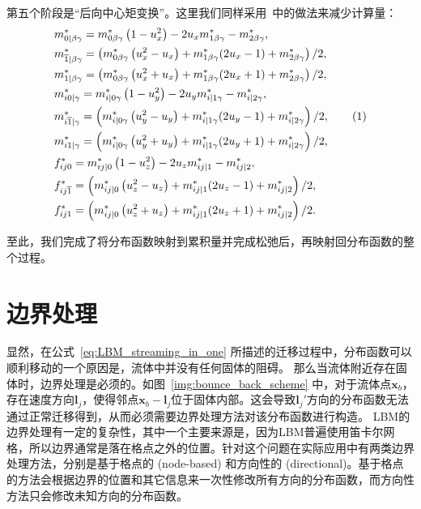 第五个阶段是“后向中心矩变换”。这里我们同样采用~\citep{Geier-2015}中的做法来减少计算量：
\begin{align*}
    & m_{0 \mid \beta \gamma}^{*}=m_{0 \beta \gamma}^{*}\left(1-u_x^{2}\right)-2u_x m_{1 \beta \gamma}^{*}-m_{2 \beta \gamma}^{*}, \\
    & m_{\overline{1} \mid \beta \gamma}^{*}=\left(m_{0 \beta \gamma}^{*}\left(u_x^{2}-u_x\right)+m_{1 \beta \gamma}^{*}(2 u_x-1)+m_{2 \beta \gamma}^{*}\right) / 2, \\
    & m_{1 \mid \beta \gamma}^{*}=\left(m_{0 \beta \gamma}^{*}\left(u_x^{2}+u_x\right)+m_{1 \beta \gamma}^{*}(2 u_x+1)+m_{2 \beta \gamma}^{*}\right) / 2, \\
    & m_{i 0 \mid \gamma}^{*}=m_{i \mid 0 \gamma}^{*}\left(1-u_y^{2}\right)-2u_y m_{i \mid 1 \gamma}^{*}-m_{i \mid 2 \gamma}^{*}, \\
    & m_{i \overline{1} \mid \gamma}^{*}=\left(m_{i \mid 0 \gamma}^{*}\left(u_y^{2}-u_y\right)+m_{i \mid 1 \gamma}^{*}(2 u_y-1)+m_{i \mid 2 \gamma}^{*}\right) / 2, \stepcounter{equation}\tag{\theequation} \\
    & m_{i 1 \mid \gamma}^{*}=\left(m_{i \mid 0 \gamma}^{*}\left(u_y^{2}+u_y\right)+m_{i \mid 1 \gamma}^{*}(2 u_y+1)+m_{i \mid 2 \gamma}^{*}\right) / 2, \\
    & f_{i j 0}^{*}=m_{i j \mid 0}^{*}\left(1-u_z^{2}\right)-2u_z m_{i j \mid 1}^{*}-m_{i j \mid 2}^{*}, \\
    & f_{i j \overline{1}}^{*}=\left(m_{i j \mid 0}^{*}\left(u_z^{2}-u_z\right)+m_{i j \mid 1}^{*}(2 u_z-1)+m_{i j \mid 2}^{*}\right) / 2, \\
    & f_{i j 1}^{*}=\left(m_{i j \mid 0}^{*}\left(u_z^{2}+u_z\right)+m_{i j \mid 1}^{*}(2 u_z+1)+m_{i j \mid 2}^{*}\right) / 2 .
\end{align*}

至此，我们完成了将分布函数映射到累积量并完成松弛后，再映射回分布函数的整个过程。
    

\section{边界处理}
\label{sec:boundary_treatment}
显然，在公式~\ref{eq:LBM_streaming_in_one} 所描述的迁移过程中，分布函数可以顺利移动的一个原因是，流体中并没有任何固体的阻碍。
那么当流体附近存在固体时，边界处理是必须的。如图~\ref{img:bounce_back_scheme} 中，对于流体点$\bm{x}_b$，存在速度方向$\bm{l}_j$，使得邻点$\bm{x}_b-\bm{l}_j$位于固体内部。这会导致$\bm{l}_j'$方向的分布函数无法通过正常迁移得到，从而必须需要边界处理方法对该分布函数进行构造。
LBM的边界处理有一定的复杂性，其中一个主要来源是，因为LBM普遍使用笛卡尔网格，所以边界通常是落在格点之外的位置。针对这个问题在实际应用中有两类边界处理方法，分别是基于格点的 (node-based) 和方向性的 (directional)。基于格点的方法会根据边界的位置和其它信息来一次性修改所有方向的分布函数，而方向性方法只会修改未知方向的分布函数。

